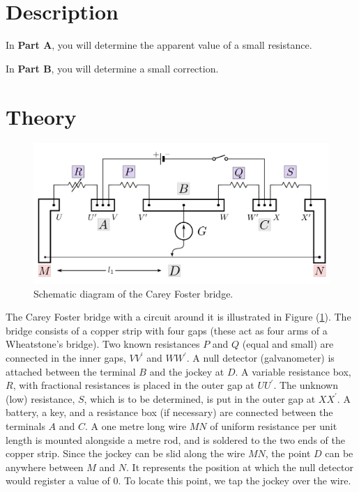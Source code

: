 \section*{Description}

In \textbf{Part A}, you will determine the apparent value of a small resistance. 

In \textbf{Part B}, you will determine a small correction. 


\section*{Theory}

\begin{figure}[!htb]
    \centering
    \includegraphics[width=\textwidth]{figs/carey.png}
    \caption{Schematic diagram of the Carey Foster bridge.}
    \label{fig:carey}
\end{figure}

The Carey Foster bridge with a circuit around it is illustrated in Figure (\ref{fig:carey}).
The bridge consists of a copper strip
with four gaps (these act as four arms of a Wheatstone’s bridge). Two known resistances $P$ and $Q$ (equal and small) are connected in the inner gaps, $VV^{\prime}$ and $WW^{\prime}$. A null detector (galvanometer) is attached between the terminal $B$ and the jockey at $D$.
A variable resistance box, $R$, with fractional resistances is placed in the outer gap at $UU^{\prime}$. The unknown (low) resistance, $S$, which is to be determined, is put in the 
outer gap at $XX^{\prime}$. A battery, a key, and a resistance box (if necessary) are connected between the terminals $A$ and $C$. A one metre long wire $MN$ of uniform resistance per unit length is mounted alongside a metre rod, and is soldered to the two ends of the copper strip. Since the jockey can be slid along the wire $MN$, the point $D$ can be anywhere between $M$ and $N$. It represents the position at which the null detector would register a value of 0. To locate this point, we tap the jockey over the wire. 

